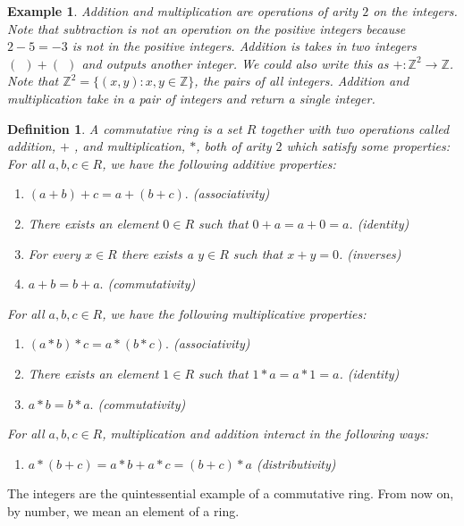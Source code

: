 \documentclass{article}
\theoremstyle{problemstyle}
\newtheorem{example}{Example}
\newtheorem{definition}{Definition}
\begin{document}
\begin{example}
Addition and multiplication are operations of arity $2$ on the integers. Note that subtraction is not an operation on the positive integers because $2-5 = -3$ is not in the positive integers.  Addition is takes in two integers $( \ \ )+( \ \ )$ and outputs another integer. We could also write this as $+:\mathbb{Z}^2 \rightarrow \mathbb{Z}$. Note that $\mathbb{Z}^2 = \{(x,y):x,y \in \mathbb{Z}\}$, the pairs of all integers. Addition and multiplication take in a pair of integers and return a single integer. 
\end{example}

\begin{definition}
A commutative ring is a set $R$ together with two operations called addition, $+$ ,  and multiplication, $*$,  both of arity $2$ which satisfy some properties:\\

For all $a,b,c \in R$, we have the following additive properties:
\begin{enumerate}
\item $(a+b)+c = a+(b+c).$ (associativity)
\item There exists an element $0 \in R$ such that $0 + a = a + 0 = a$. (identity)
\item For every $x \in R$ there exists a $y \in R$ such that $x + y  = 0$. (inverses)
\item $a+b = b+a.$ (commutativity)
\end{enumerate}
For all $a,b,c \in R$, we have the following multiplicative properties:
\begin{enumerate}
\item $(a*b)*c = a*(b*c).$ (associativity)
\item There exists an element $1 \in R$ such that $1*a = a*1 = a$. (identity)
\item $a*b = b*a.$ (commutativity)
\end{enumerate}
For all $a,b,c \in R$, multiplication and addition interact in the following ways:
\begin{enumerate}
\item $a*(b+c) = a*b + a*c = (b+c)*a$ (distributivity)
\end{enumerate}
\end{definition}

The integers are the quintessential example of a commutative ring. From now on, by number, we mean an element of a ring.\\
\end{document}
